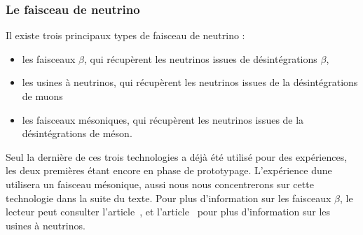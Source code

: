             \subsubsection{Le faisceau de neutrino}\label{sec::faisceau}
        
            Il existe trois principaux types de faisceau de neutrino :
            \begin{itemize}
                \item les faisceaux $\beta$, qui récupèrent les neutrinos issues de désintégrations $\beta$,
                \item les usines à neutrinos, qui récupèrent les neutrinos issues de la désintégrations de muons
                \item les faisceaux mésoniques, qui récupèrent les neutrinos issues de la désintégrations de méson.
            \end{itemize}
            Seul la dernière de ces trois technologies a déjà été utilisé pour des expériences, les deux premières étant encore en phase de prototypage. L'expérience \gls{dune} utilisera un faisceau mésonique, aussi nous nous concentrerons sur cette technologie dans la suite du texte. Pour plus d'information sur les faisceaux $\beta$, le lecteur peut consulter l'article~\cite{Wildner2012}, et l'article~\cite{Bogomilov2014} pour plus d'information sur les usines à neutrinos.
            
            
